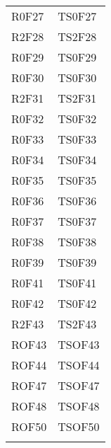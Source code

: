 \documentclass[../PianoDiQualifica.tex]{subfiles}
\begin{document}
\begin{longtable}[c] { >{\centering\arraybackslash}p{3cm} >{\centering\arraybackslash}p{3cm}}
			\addlinespace[0.3em]
			\midrule
			\addlinespace[0.3em]
			R0F27 & TS0F27 \\ 
			\addlinespace[0.3em]
			\midrule
			\addlinespace[0.3em]
			R2F28 & TS2F28 \\ 
			\addlinespace[0.3em]
			\midrule
			\addlinespace[0.3em]
			R0F29 & TS0F29 \\ 
			\addlinespace[0.3em]
			\midrule
			\addlinespace[0.3em]
			R0F30 & TS0F30 \\ 
			\addlinespace[0.3em]
			\midrule
			\addlinespace[0.3em]
			R2F31 & TS2F31 \\ 
			\addlinespace[0.3em]
			\midrule
			\addlinespace[0.3em]
			R0F32 & TS0F32 \\
			\addlinespace[0.3em]
			\midrule
			\addlinespace[0.3em]
			R0F33 & TS0F33 \\ 
			\addlinespace[0.3em]
			\midrule
			\addlinespace[0.3em]
			R0F34 & TS0F34 \\ 
			\addlinespace[0.3em]
			\midrule
			\addlinespace[0.3em]
			R0F35 & TS0F35 \\ 
			\addlinespace[0.3em]
			\midrule
			\addlinespace[0.3em]
			R0F36 & TS0F36 \\
			\addlinespace[0.3em]
			\midrule
			\addlinespace[0.3em]
			R0F37 & TS0F37 \\ 
			\addlinespace[0.3em]
			\midrule
			\addlinespace[0.3em]
			R0F38 & TS0F38 \\ 
			\addlinespace[0.3em]
			\midrule
			\addlinespace[0.3em]	
			R0F39 & TS0F39 \\ 
			\addlinespace[0.3em]
			\midrule
			\addlinespace[0.3em]
			R0F41 & TS0F41 \\
			\addlinespace[0.3em]
			\midrule
			\addlinespace[0.3em]
			R0F42 & TS0F42 \\ 
			\addlinespace[0.3em]
			\midrule
			\addlinespace[0.3em]
			R2F43 & TS2F43 \\ 
			\addlinespace[0.3em]
			\midrule
			\addlinespace[0.3em]
			ROF43 & TSOF43 \\ 
			\addlinespace[0.3em]
			\midrule
			\addlinespace[0.3em]
			ROF44 & TSOF44 \\ 
			\addlinespace[0.3em]
			\midrule
			\addlinespace[0.3em]
			ROF47 & TSOF47 \\ 
			\addlinespace[0.3em]
			\midrule
			\addlinespace[0.3em]
			ROF48 & TSOF48 \\ 
			\addlinespace[0.3em]
			\midrule
			\addlinespace[0.3em]
			ROF50 & TSOF50 \\ 
			\addlinespace[0.3em]
			\midrule
			\addlinespace[0.3em]

\end{longtable}
\end{document}
